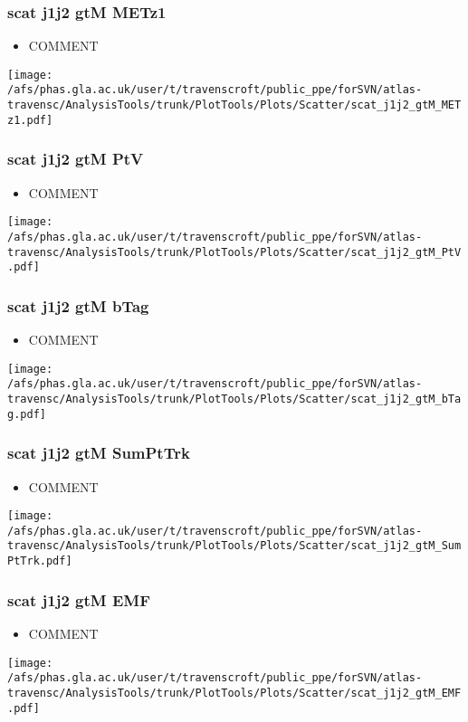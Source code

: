 \documentclass{beamer}
\begin{document}
\begin{frame}
\frametitle{scat j1j2 gtM METz1}
\begin{itemize}
\item COMMENT
\end{itemize}
\begin{center}
\texttt{[image: /afs/phas.gla.ac.uk/user/t/travenscroft/public\_ppe/forSVN/atlas-travensc/AnalysisTools/trunk/PlotTools/Plots/Scatter/scat\_j1j2\_gtM\_METz1.pdf]}
\end{center}
\end{frame}

\begin{frame}
\frametitle{scat j1j2 gtM PtV}
\begin{itemize}
\item COMMENT
\end{itemize}
\begin{center}
\texttt{[image: /afs/phas.gla.ac.uk/user/t/travenscroft/public\_ppe/forSVN/atlas-travensc/AnalysisTools/trunk/PlotTools/Plots/Scatter/scat\_j1j2\_gtM\_PtV.pdf]}
\end{center}
\end{frame}

\begin{frame}
\frametitle{scat j1j2 gtM bTag}
\begin{itemize}
\item COMMENT
\end{itemize}
\begin{center}
\texttt{[image: /afs/phas.gla.ac.uk/user/t/travenscroft/public\_ppe/forSVN/atlas-travensc/AnalysisTools/trunk/PlotTools/Plots/Scatter/scat\_j1j2\_gtM\_bTag.pdf]}
\end{center}
\end{frame}

\begin{frame}
\frametitle{scat j1j2 gtM SumPtTrk}
\begin{itemize}
\item COMMENT
\end{itemize}
\begin{center}
\texttt{[image: /afs/phas.gla.ac.uk/user/t/travenscroft/public\_ppe/forSVN/atlas-travensc/AnalysisTools/trunk/PlotTools/Plots/Scatter/scat\_j1j2\_gtM\_SumPtTrk.pdf]}
\end{center}
\end{frame}

\begin{frame}
\frametitle{scat j1j2 gtM EMF}
\begin{itemize}
\item COMMENT
\end{itemize}
\begin{center}
\texttt{[image: /afs/phas.gla.ac.uk/user/t/travenscroft/public\_ppe/forSVN/atlas-travensc/AnalysisTools/trunk/PlotTools/Plots/Scatter/scat\_j1j2\_gtM\_EMF.pdf]}
\end{center}
\end{frame}
\end{document}
